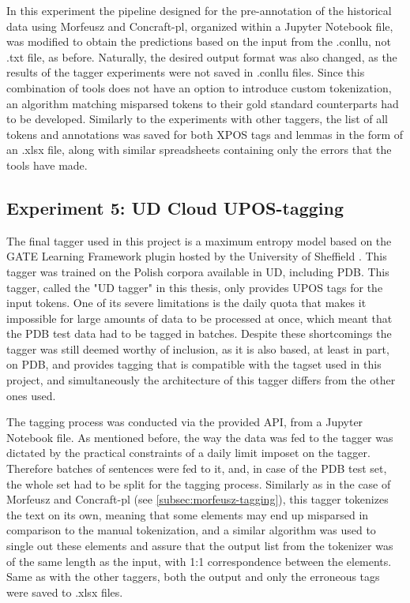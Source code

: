 In this experiment the pipeline designed for the pre-annotation of the historical data using Morfeusz and Concraft-pl, organized within a Jupyter Notebook file, was modified to obtain the predictions based on the input from the .conllu, not .txt file, as before. Naturally, the desired output format was also changed, as the results of the tagger experiments were not saved in .conllu files. Since this combination of tools does not have an option to introduce custom tokenization, an algorithm matching misparsed tokens to their gold standard counterparts had to be developed. Similarly to the experiments with other taggers, the list of all tokens and annotations was saved for both XPOS tags and lemmas in the form of an .xlsx file, along with similar spreadsheets containing only the errors that the tools have made.

\subsection{Experiment 5: UD Cloud UPOS-tagging}
\label{subsec:ud-tagging}

The final tagger used in this project is a maximum entropy model based on the GATE Learning Framework plugin hosted by the University of Sheffield \citep{gatecloud}. This tagger was trained on the Polish corpora available in UD, including PDB. This tagger, called the "UD tagger" in this thesis, only provides UPOS tags for the input tokens. One of its severe limitations is the daily quota that makes it impossible for large amounts of data to be processed at once, which meant that the PDB test data had to be tagged in batches. Despite these shortcomings the tagger was still deemed worthy of inclusion, as it is also based, at least in part, on PDB, and provides tagging that is compatible with the tagset used in this project, and simultaneously the architecture of this tagger differs from the other ones used.

The tagging process was conducted via the provided API, from a Jupyter Notebook file. As mentioned before, the way the data was fed to the tagger was dictated by the practical constraints of a daily limit imposet on the tagger. Therefore batches of sentences were fed to it, and, in case of the PDB test set, the whole set had to be split for the tagging process. Similarly as in the case of Morfeusz and Concraft-pl (see \autoref{subsec:morfeusz-tagging}), this tagger tokenizes the text on its own, meaning that some elements may end up misparsed in comparison to the manual tokenization, and a similar algorithm was used to single out these elements and assure that the output list from the tokenizer was of the same length as the input, with 1:1 correspondence between the elements. Same as with the other taggers, both the output and only the erroneous tags were saved to .xlsx files.

